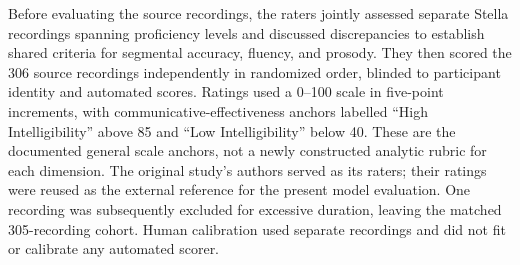 \documentclass[10pt]{article}
\begin{document}
Before evaluating the source recordings, the raters jointly assessed separate Stella recordings spanning proficiency levels and discussed discrepancies to establish shared criteria for segmental accuracy, fluency, and prosody. They then scored the 306 source recordings independently in randomized order, blinded to participant identity and automated scores. Ratings used a 0--100 scale in five-point increments, with communicative-effectiveness anchors labelled ``High Intelligibility'' above 85 and ``Low Intelligibility'' below 40. These are the documented general scale anchors, not a newly constructed analytic rubric for each dimension. The original study's authors served as its raters; their ratings were reused as the external reference for the present model evaluation. One recording was subsequently excluded for excessive duration, leaving the matched 305-recording cohort. Human calibration used separate recordings and did not fit or calibrate any automated scorer.
\end{document}
